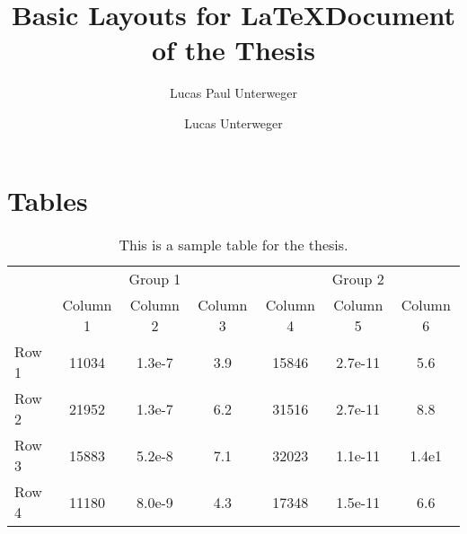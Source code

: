 \documentclass[12pt,a4paper]{article}
\author{Lucas Paul Unterweger}
\title{Basic Layouts for \LaTeX Document of the Thesis}
\author{Lucas Unterweger}
\begin{document}
\maketitle
\newpage

\section{Tables}

\begin{table}[!h]
\centering
\begin{tabular}{lcccccc}\toprule
		& \multicolumn{3}{c}{Group 1} & \multicolumn{3}{c}{Group 2}\\
		\cmidrule(r{4pt}){2-4} \cmidrule(l){5-7}
     	& Column 1  & Column 2 & Column 3 & Column 4  & Column 5 & Column 6\\\midrule
Row 1   	& 11034 & 1.3e-7 & 3.9 & 15846 & 2.7e-11 & 5.6 \\
Row 2 	& 21952 & 1.3e-7 & 6.2 & 31516 & 2.7e-11 & 8.8 \\
Row 3 	& 15883 & 5.2e-8 & 7.1 & 32023 & 1.1e-11 & 1.4e1\\
Row 4   	& 11180 & 8.0e-9 & 4.3 & 17348 & 1.5e-11 & 6.6 \\\bottomrule
\end{tabular}
\caption{This is a sample table for the thesis.}
\label{tab:table1}
\end{table}
\end{document}
